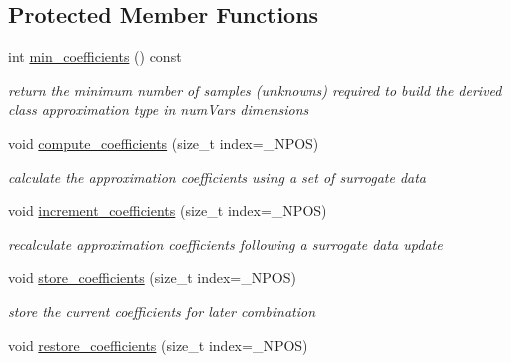 \subsection*{Protected Member Functions}
\begin{DoxyCompactItemize}
\item 
int \hyperlink{classPecos_1_1RegressOrthogPolyApproximation_ac789358ee49633613d6c97593be06f9d}{min\+\_\+coefficients} () const \label{classPecos_1_1RegressOrthogPolyApproximation_ac789358ee49633613d6c97593be06f9d}

\begin{DoxyCompactList}\small\item\em return the minimum number of samples (unknowns) required to build the derived class approximation type in num\+Vars dimensions \end{DoxyCompactList}\item 
void \hyperlink{classPecos_1_1RegressOrthogPolyApproximation_aef8f0c32bdeff7756a9c614607c03058}{compute\+\_\+coefficients} (size\+\_\+t index=\+\_\+\+N\+P\+OS)\label{classPecos_1_1RegressOrthogPolyApproximation_aef8f0c32bdeff7756a9c614607c03058}

\begin{DoxyCompactList}\small\item\em calculate the approximation coefficients using a set of surrogate data \end{DoxyCompactList}\item 
void \hyperlink{classPecos_1_1RegressOrthogPolyApproximation_a8ba12605934048176c1d1c5722465523}{increment\+\_\+coefficients} (size\+\_\+t index=\+\_\+\+N\+P\+OS)\label{classPecos_1_1RegressOrthogPolyApproximation_a8ba12605934048176c1d1c5722465523}

\begin{DoxyCompactList}\small\item\em recalculate approximation coefficients following a surrogate data update \end{DoxyCompactList}\item 
void \hyperlink{classPecos_1_1RegressOrthogPolyApproximation_abc17a7104c33d8146f4a0ee7b6c6f37a}{store\+\_\+coefficients} (size\+\_\+t index=\+\_\+\+N\+P\+OS)\label{classPecos_1_1RegressOrthogPolyApproximation_abc17a7104c33d8146f4a0ee7b6c6f37a}

\begin{DoxyCompactList}\small\item\em store the current coefficients for later combination \end{DoxyCompactList}\item 
void \hyperlink{classPecos_1_1RegressOrthogPolyApproximation_ad05b093ee96314c9e05bad8e06c2dae7}{restore\+\_\+coefficients} (size\+\_\+t index=\+\_\+\+N\+P\+OS)\label{classPecos_1_1RegressOrthogPolyApproximation_ad05b093ee96314c9e05bad8e06c2dae7}


\end{DoxyCompactItemize}
